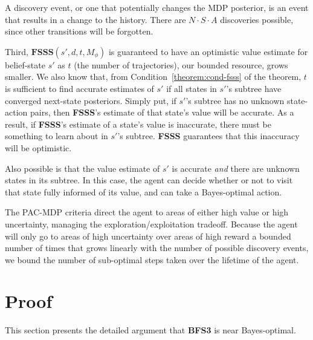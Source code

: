 A discovery event, or one that potentially changes the MDP posterior, is an event that results in a change to the history. There are $N \cdot S \cdot A$ discoveries possible, since other transitions will be forgotten.

Third, $\mathbf{FSSS}(s',d,t,M_\phi)$ is guaranteed to have an optimistic value estimate for belief-state $s'$ as $t$ (the number of trajectories), our bounded resource, grows smaller. We also know that, from Condition~\ref{theorem:cond-fsss} of the theorem, $t$ is sufficient to find accurate estimates of $s'$ if all states in $s'$'s subtree have converged next-state posteriors. Simply put, if $s'$'s subtree has no unknown state-action pairs, then {\bf FSSS}'s estimate of that state's value will be accurate.  As a result, if {\bf FSSS}'s estimate of a state's value is inaccurate, there must be something to learn about in $s'$'s subtree. {\bf FSSS} guarantees that this inaccuracy will be optimistic.

Also possible is that the value estimate of $s'$ is accurate \emph{and} there are unknown states in its subtree. In this case, the agent can decide whether or not to visit that state fully informed of its value, and can take a Bayes-optimal action.

The PAC-MDP criteria direct the agent to areas of either high value or high uncertainty, managing the exploration/exploitation tradeoff. Because the agent will only go to areas of high uncertainty over areas of high reward a bounded number of times that grows linearly with the number of possible discovery events, we bound the number of sub-optimal steps taken over the lifetime of the agent.

\section{Proof}


This section presents the detailed argument that {\bf BFS3} is near
Bayes-optimal.

